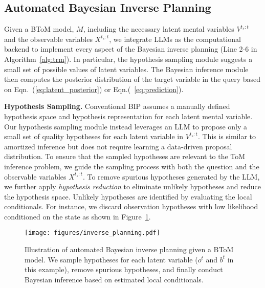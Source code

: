 \subsection{Automated Bayesian Inverse Planning}
\label{sec:inverse_planning}

Given a BToM model, $M$, including the necessary latent mental variables $V^{t_s:t}$ and the observable variables $X^{t_s:t}$, we integrate LLMs as the computational backend to implement every aspect of the Bayesian inverse planning (Line 2-6 in Algorithm~\ref{alg:trm}). In particular, the hypothesis sampling module suggests a small set of possible values of latent variables. The Bayesian inference module then computes the posterior distribution of the target variable in the query based on Eqn.~(\ref{eq:latent_posterior}) or Eqn.(~\ref{eq:prediction}).

\textbf{Hypothesis Sampling.} Conventional BIP assumes a manually defined hypothesis space and hypothesis representation for each latent mental variable. Our hypothesis sampling module instead leverages an LLM to propose only a small set of quality hypotheses for each latent variable in $V^{t_s:t}$. This is similar to amortized inference \cite{ritchie2016deep,jha2024neural} but does not require learning a data-driven proposal distribution. To ensure that the sampled hypotheses are relevant to the ToM inference problem, we guide the sampling process with both the question and the observable variables $X^{t_s:t}$. To remove spurious hypotheses generated by the LLM, we further apply \textit{hypothesis reduction} to eliminate unlikely hypotheses and reduce the hypothesis space. Unlikely hypotheses are identified by evaluating the local conditionals. For instance, we discard observation hypotheses with low likelihood conditioned on the state as shown in Figure~\ref{fig:inverse_planning}.

\begin{figure}[t!]
  \centering
  \texttt{[image: figures/inverse\_planning.pdf]}
    \vspace{-10pt}
  \caption{Illustration of automated Bayesian inverse planning given a BToM model. We sample hypotheses for each latent variable ($o^t$ and $b^t$ in this example), remove spurious hypotheses, and finally conduct Bayesian inference based on estimated local conditionals.}
  \label{fig:inverse_planning}
  \vspace{-10pt}
\end{figure}



